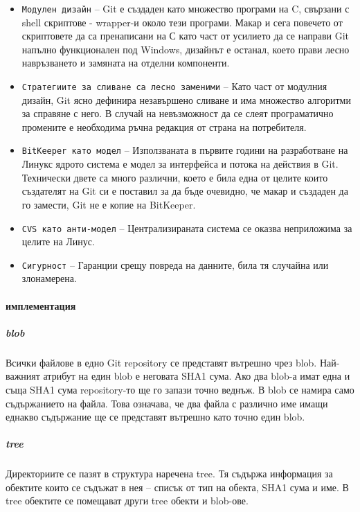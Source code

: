 \documentclass[a4paper]{article}
\begin{document}
\begin{itemize}
      \item \texttt{Модулен дизайн} -- Git е създаден като множество програми на C, свързани с shell скриптове - wrapper-и около тези програми. Макар и сега повечето от скриптовете да са пренаписани на С като част от усилието да се направи Git напълно функционален под Windows, дизайнът е останал, което прави лесно навръзването и замяната на отделни компоненти.
      \item \texttt{Стратегиите за сливане са лесно заменими} -- Като част от модулния дизайн, Git ясно дефинира незавършено сливане и има множество алгоритми за справяне с него. В случай на невъзможност да се слеят програматично промените е необходима ръчна редакция от страна на потребителя.
      \item \texttt{BitKeeper като модел} -- Използваната в първите години на разработване на Линукс ядрото система е модел за интерфейса и потока на действия в Git. Технически двете са много различни, което е била една от целите които създателят на Git си е поставил за да бъде очевидно, че макар и създаден да го замести, Git не е копие на BitKeeper.
      \item \texttt{CVS като анти-модел} -- Централизираната система се оказва неприложима за целите на Линус.
      \item \texttt{Сигурност} -- Гаранции срещу повреда на данните, била тя случайна или злонамерена.
    \end{itemize}

    \paragraph{имплементация}
      
      \subparagraph{blob}
      Всички файлове в едно Git repository се представят вътрешно чрез blob.
      Най-важният атрибут на един blob е неговата SHA1 сума. Ако два blob-а
      имат една и съща SHA1 сума repository-то ще го запази точно веднъж.
      В blob се намира само съдържанието на файла. Това означава, че два файла
      с различно име имащи еднакво съдържание ще се представят вътрешно като
      точно един blob.

      \subparagraph{tree}
      Директориите се пазят в структура наречена tree. Тя съдържа информация за обектите които се съдъжат в нея -- списък от тип на обекта, SHA1 сума и име. В tree обектите се помещават други tree обекти и blob-ове.
\end{document}
